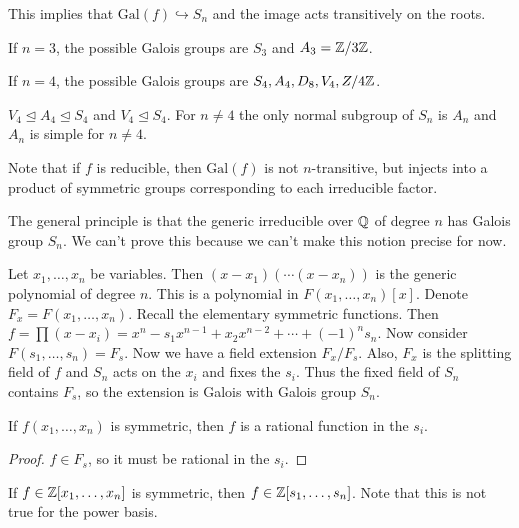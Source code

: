 \message{ !name(notes.tex)}\documentclass[10pt, twoside]{article}
\begin{document}
        This implies that $\mathrm{Gal}(f) \hookrightarrow S_n$ and the image acts transitively on the roots.

        \begin{exm}
            If $n=3$, the possible Galois groups are $S_3$ and $A_3 = \mathbb{Z}/3\mathbb{Z}$.

            If $n=4$, the possible Galois groups are $S_4, A_4, D_8, V_4, Z/4\mathbb{Z}$.
        \end{exm}

        \begin{rmk}
            $V_4 \trianglelefteq A_4 \trianglelefteq S_4$ and $V_4 \trianglelefteq S_4$. For $n \neq 4$ the only normal subgroup of $S_n$ is $A_n$ and $A_n$ is simple for $n \neq 4$.
        \end{rmk}

        Note that if $f$ is reducible, then $\mathrm{Gal}(f)$ is not $n$-transitive, but injects into a product of symmetric groups corresponding to each irreducible factor.

        The general principle is that the generic irreducible over $\mathbb{Q}$ of degree $n$ has Galois group $S_n$. We can't prove this because we can't make this notion precise for now.

        Let $x_1, \ldots, x_n$ be variables. Then $(x-x_1)(\cdots (x-x_n))$ is the generic polynomial of degree $n$. This is a polynomial in $F(x_1, \ldots, x_n)[x]$. Denote $F_x = F(x_1, \ldots, x_n)$. Recall the elementary symmetric functions. Then $f = \prod (x-x_i) = x^n - s_1 x^{n-1} + x_2x^{n-2} + \cdots + (-1)^n s_n$. Now consider $F(s_1, \ldots, s_n) = F_s$. Now we have a field extension $F_x/F_s$. Also, $F_x$ is the splitting field of $f$ and $S_n$ acts on the $x_i$ and fixes the $s_i$. Thus the fixed field of $S_n$ contains $F_s$, so the extension is Galois with Galois group $S_n$.

        \begin{cor}
            If $f(x_1, \ldots, x_n)$ is symmetric, then $f$ is a rational function in the $s_i$.
            \begin{proof}
                $f \in F_s$, so it must be rational in the $s_i$.
            \end{proof}
        \end{cor}

        \begin{rmk}
            If $f \in \mathbb{Z}[x_1, \ldots, x_n]$ is symmetric, then $f \in \mathbb{Z}[s_1, \ldots, s_n]$. Note that this is not true for the power basis.
        \end{rmk}
\end{document}
